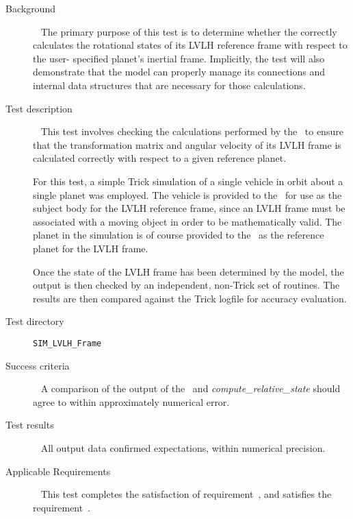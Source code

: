 \label{test:calcs}
\begin{description}
\item[Background]\ \newline
The primary purpose of this test
is to determine whether the \LvlhFrameDesc correctly calculates the
rotational states of its LVLH reference frame with respect to the user-
specified planet's inertial frame. Implicitly, the test will also
demonstrate that the model can properly manage its connections and
internal data structures that are necessary for those calculations.

\item[Test description]\ \newline
This test involves checking the calculations performed by the \LvlhFrameDesc\
to ensure that the transformation matrix and angular velocity of its LVLH
frame is calculated correctly with respect to a given reference planet.

For this test, a simple Trick simulation of a single vehicle in orbit about
a single planet was employed. The vehicle is provided to the \LvlhFrameDesc\
for use as the subject body for the LVLH reference frame, since an LVLH frame
must be associated with a moving object in order to be mathematically valid.
The planet in the simulation is of course provided to the \LvlhFrameDesc\ as
the reference planet for the LVLH frame.

Once the state of the LVLH frame has been determined by the model, the output
is then checked by an independent, non-Trick set of routines. The results are
then compared against the Trick logfile for accuracy evaluation.

\item[Test directory] {\tt SIM\_LVLH\_Frame}

\item[Success criteria]\ \newline
A comparison of the output of the \LvlhFrameDesc\ and
\textit{compute\_relative\_state} should agree to within approximately
numerical error.

\item[Test results]\ \newline
All output data confirmed expectations, within numerical precision.

\item[Applicable Requirements]\ \newline
This test completes the satisfaction of requirement~,
and satisfies the requirement~.

\end{description}


\newpage
\boilerplatetraceability

\newpage
\boilerplatemetrics
